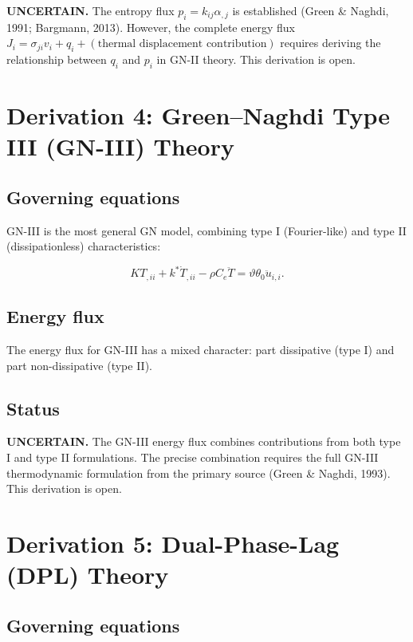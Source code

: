 \textbf{UNCERTAIN.} The entropy flux $p_i = k_{ij}\alpha_{,j}$ is established (Green \& Naghdi, 1991; Bargmann, 2013). However, the complete energy flux $J_i = \sigma_{ji}v_i + q_i + (\text{thermal displacement contribution})$ requires deriving the relationship between $q_i$ and $p_i$ in GN-II theory. This derivation is open.

\section{Derivation 4: Green--Naghdi Type III (GN-III) Theory}

\subsection{Governing equations}

GN-III is the most general GN model, combining type I (Fourier-like) and type II (dissipationless) characteristics:

\begin{equation}
K T_{,ii} + k^*\dot{T}_{,ii} - \rho C_e\ddot{T} = \vartheta\theta_0\ddot{u}_{i,i}.
\label{ef:gn3:1}
\end{equation}

\subsection{Energy flux}

The energy flux for GN-III has a mixed character: part dissipative (type I) and part non-dissipative (type II).

\subsection{Status}

\textbf{UNCERTAIN.} The GN-III energy flux combines contributions from both type I and type II formulations. The precise combination requires the full GN-III thermodynamic formulation from the primary source (Green \& Naghdi, 1993). This derivation is open.

\section{Derivation 5: Dual-Phase-Lag (DPL) Theory}

\subsection{Governing equations}

